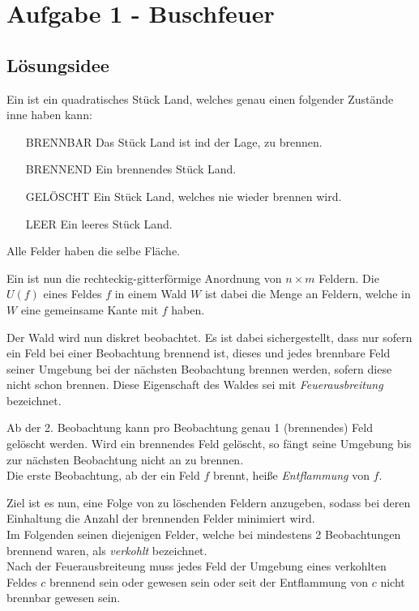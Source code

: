 \section{Aufgabe 1 - Buschfeuer}
\subsection{Lösungsidee}

Ein  ist ein quadratisches Stück Land, welches genau einen folgender Zustände inne haben kann:
\begin{itemize}
\item[BRENNBAR] Das Stück Land ist ind der Lage, zu brennen.
\item[BRENNEND] Ein brennendes Stück Land.
\item[GELÖSCHT] Ein Stück Land, welches nie wieder brennen  wird.
\item[LEER] Ein leeres Stück Land.
\end{itemize}

Alle Felder haben die selbe Fläche.

Ein  ist nun die rechteckig-gitterförmige Anordnung von $n\times m$ Feldern. Die  $U(f)$ eines Feldes $f$ in einem Wald $W$ ist dabei die Menge an Feldern, welche in $W$ eine gemeinsame Kante mit $f$ haben.

Der Wald wird nun diskret beobachtet. Es ist dabei sichergestellt, dass nur sofern ein Feld bei einer Beobachtung brennend ist, dieses und jedes brennbare Feld seiner Umgebung bei der nächsten Beobachtung brennen werden, sofern diese nicht schon brennen. Diese Eigenschaft des Waldes sei mit \emph{Feuerausbreitung} bezeichnet.

Ab der 2. Beobachtung kann pro Beobachtung genau 1 (brennendes) Feld gelöscht werden. Wird ein brennendes Feld gelöscht, so fängt seine Umgebung bis zur nächsten Beobachtung nicht an zu brennen.\\
Die erste Beobachtung, ab der ein Feld $f$ brennt, heiße \emph{Entflammung} von $f$.


Ziel ist es nun, eine Folge von zu löschenden Feldern anzugeben, sodass bei deren Einhaltung die Anzahl der brennenden Felder minimiert wird.\\


Im Folgenden seinen diejenigen Felder, welche bei mindestens 2 Beobachtungen brennend waren, als \emph{verkohlt} bezeichnet.\\
Nach der Feuerausbreiteung muss jedes Feld der Umgebung eines verkohlten Feldes $c$ brennend sein oder gewesen sein oder seit der Entflammung von $c$ nicht brennbar gewesen sein.

